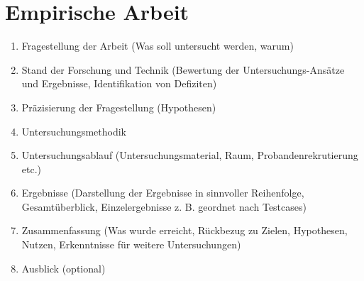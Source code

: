 \section{Empirische Arbeit}\label{subsec:a3}

\begin{enumerate}
    \item{Fragestellung der Arbeit (Was soll untersucht werden, warum)}
    \item{Stand der Forschung und Technik (Bewertung der Untersuchungs-Ansätze und Ergebnisse, Identifikation von Defiziten)}
    \item{Präzisierung der Fragestellung (Hypothesen)}
    \item{Untersuchungsmethodik }
    \item{Untersuchungsablauf (Untersuchungsmaterial, Raum, Probandenrekrutierung etc.)}
    \item{Ergebnisse (Darstellung der Ergebnisse in sinnvoller  Reihenfolge, Gesamtüberblick, Einzelergebnisse z. B. geordnet nach Testcases)}
    \item{Zusammenfassung (Was wurde erreicht, Rückbezug zu Zielen, Hypothesen, Nutzen, Erkenntnisse für weitere Untersuchungen)}
    \item{Ausblick (optional)}
\end{enumerate}
